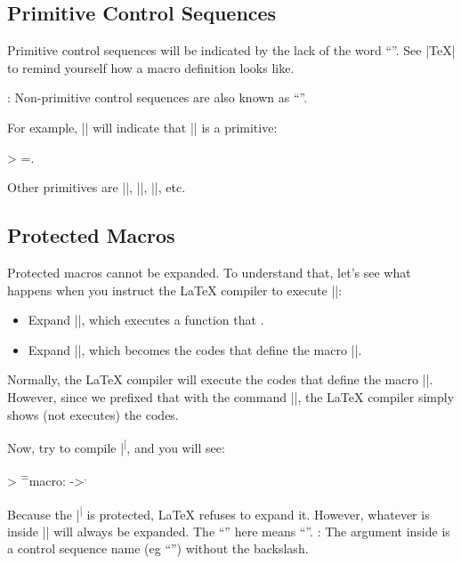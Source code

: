 \subsection{Primitive Control Sequences}

Primitive control sequences will be indicated by the lack of the word ``''. See \cil|\show\TeX| to remind yourself how a macro definition looks like.

: Non-primitive control sequences are also known as ``''.

For example, \cil|\show\kern| will indicate that \cil|\kern| is a primitive:

\begin{outputcfb}
> \kern=\kern.
\end{outputcfb}

Other primitives are \cil|\show|, \cil|\lower|, \cil|\hbox|, etc.

\subsection{Protected Macros}

Protected macros cannot be expanded. To understand that, let's see what happens when you instruct the LaTeX compiler to execute \cil|\show\thinspace|:

\begin{itemize}
  \item Expand \cil|\show|, which executes a function that .
  \item Expand \cil|\thinspace|, which becomes the codes that define the macro \cil|\thinspace|.
\end{itemize}

Normally, the LaTeX compiler will execute the codes that define the macro \cil|\thinspace|. However, since we prefixed that with the command \cil|\show|, the LaTeX compiler simply shows (not executes) the codes.

Now, try to compile \cil|\show\textsuperscript|, and you will see:

\begin{outputcfb}
> \textsuperscript=macro:
->\protect \textsuperscript  .
\end{outputcfb}

Because the \cil|\textsuperscript| is protected, LaTeX refuses to expand it. However, whatever is inside \cil|\csname \endcsname| will always be expanded. The ``'' here means ``''. : The argument inside is a control sequence name (eg ``'') without the backslash.

